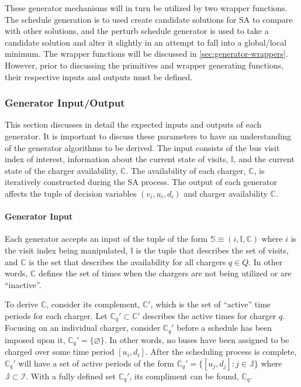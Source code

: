 \documentclass[11pt,a4paper,final]{article}
\newcommand{\I}{\mathbb{I}}                 %
\newcommand{\C}{\mathbb{C}}                 %
\newcommand{\Sol}{\mathbb{S}}               %
\newcommand{\Qset}{Q}                       %
\newcommand{\Jsetq}{\mathbb{J}}             %
\begin{document}
These generator mechanisms will in turn be utilized by two wrapper functions. The schedule generation is to used create
candidate solutions for SA to compare with other solutions, and the perturb schedule generator is used to take a
candidate solution and alter it slightly in an attempt to fall into a global/local minimum. The wrapper functions will
be discussed in \ref{sec:generator-wrappers}. However, prior to discussing the primitives and wrapper generating functions,
their respective inputs and outputs must be defined.

\subsubsection{Generator Input/Output}
\label{sec:generator-input-output}
This section discusses in detail the expected inputs and outputs of each generator. It is important to discuss these
parameters to have an understanding of the generator algorithms to be derived. The input consists of the bus visit index
of interest, information about the current state of visits, \(\I\), and the current state of the charger availability,
\(\C\). The availability of each charger, \(\C\), is iteratively constructed during the SA process. The output of each
generator affects the tuple of decision variables \((v_i, u_i, d_i)\) and charger availability \(\C\).

\paragraph{Generator Input}
\label{sec:orgb7d0c57}
Each generator accepts an input of the tuple of the form \(\Sol \equiv (i, \I, \C)\) where \(i\) is the visit index being
manipulated, \(\I\) is the tuple that describes the set of visits, and \(\C\) is the set that describes the availability for
all chargers \(q \in \Qset\). In other words, \(\C\) defines the set of times when the chargers are not being utilized or are
``inactive''.

To derive \(\C\), consider its complement, \(\C'\), which is the set of ``active'' time periods for each charger. Let \(\C_q' \subset
\C'\) describes the active times for charger \(q\). Focusing on an individual charger, consider \(\C_q'\) before a schedule
has been imposed upon it, \(\C_q' = \{ \varnothing \}\). In other words, no buses have been assigned to be charged over
some time period \([u_i, d_i]\). After the scheduling process is complete, \(\C_q'\) will have a set of active periods of
the form \(\C_q' = \{[u_j, d_j]: j \in \Jsetq \}\) where \(\Jsetq \subset \mathcal{I}\). With a fully defined set \(\C_q'\), its compliment can
be found, \(\C_q\).
\end{document}
